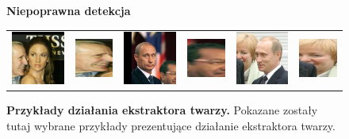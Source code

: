 \begin{figure}[H]
\begin{center}
    {\bf Niepoprawna detekcja}
    \begin{tabular}{cc||cc||cc}
      \includegraphics[width=.15\linewidth]{img/crop_examples/before/bad/Jennifer_Lopez_0020.jpg} &
      \includegraphics[width=.15\linewidth]{img/crop_examples/after/bad/Jennifer_Lopez_0020.jpg} &
      \includegraphics[width=.15\linewidth]{img/crop_examples/before/bad/Vladimir_Putin_0031.jpg} &
      \includegraphics[width=.15\linewidth]{img/crop_examples/after/bad/Vladimir_Putin_0031.jpg} &
      \includegraphics[width=.15\linewidth]{img/crop_examples/before/bad/Vladimir_Putin_0040.jpg} &
      \includegraphics[width=.15\linewidth]{img/crop_examples/after/bad/Vladimir_Putin_0040.jpg} \\
    \end{tabular}
    \end{center}
    \caption{{\bf Przykłady działania ekstraktora twarzy.} Pokazane zostały tutaj wybrane przykłady prezentujące działanie ekstraktora twarzy.}
    \label{fig:ekstraktor_twarzy}
    \end{figure}

